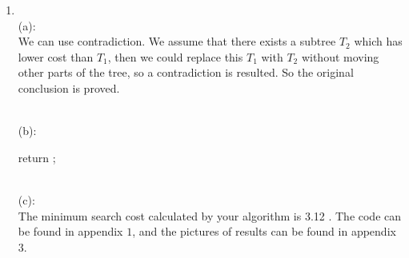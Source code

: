 \documentclass[12pt,a4paper]{article}
\makeatletter
\newtheorem*{solution}{Solution}
\theoremstyle{definition}
\renewenvironment{solution}[1][Solution] {\par\pushQED{\qed}\normalfont\topsep6\p@\@plus6\p@\relax\trivlist\item[\hskip\labelsep\bfseries#1\@addpunct{.}]\ignorespaces}{\popQED\endtrivlist\@endpefalse} \makeatother
\makeatother
\begin{document}
\begin{enumerate}
\begin{solution}
		        \\(a):\\
		        We can use contradiction. We assume that there exists a subtree $T_2$ which has lower cost than $T_1$, then we could replace this $T_1$ with $T_2$ without moving other parts of the tree, so a contradiction is resulted. So the original conclusion is proved.
		        
		        
		        \\(b):\\
		        
		\begin{algorithm}[H]   %
		
		\BlankLine
		\caption{}\label{Algorithm}
        
        return $ $;
        
            		
		
		
		
	    \end{algorithm}
		        
		        
		        \\(c):\\
		        The minimum search cost calculated by your algorithm is 3.12 . The code can be found in appendix $1$, and the pictures of results can be found in appendix $3$.
		        

\end{solution}
\end{enumerate}
\end{document}
